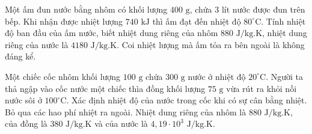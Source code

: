 \begin{ex}
Một ấm đun nước bằng nhôm có khối lượng $400\text{ g}$, chứa $3\text{ lít}$ nước được đun trên bếp. Khi nhận được nhiệt lượng $740\text{ kJ}$ thì ấm đạt đến nhiệt độ $80^\circ\text{C}$. Tính nhiệt độ ban đầu của ấm nước, biết nhiệt dung riêng của nhôm $880\text{ J/kg.K}$, nhiệt dung riêng của nước là $4180\text{ J/kg.K}$. Coi nhiệt lượng mà ấm tỏa ra bên ngoài là không đáng kể.


\end{ex}

\begin{ex}
Một chiếc cốc nhôm khối lượng $100\text{ g}$ chứa $300\text{ g}$ nước ở nhiệt độ $20^\circ\text{C}$. Người ta thả ngập vào cốc nước một chiếc thìa đồng khối lượng $75\text{ g}$ vừa rút ra khỏi nồi nước sôi ở $100^\circ\text{C}$. Xác định nhiệt độ của nước trong cốc khi có sự cân bằng nhiệt. Bỏ qua các hao phí nhiệt ra ngoài. Nhiệt dung riêng của nhôm là $880\text{ J/kg.K}$, của đồng là $380\text{ J/kg.K}$ và của nước là $4{,}19\cdot10^3\text{ J/kg.K}$.


\end{ex}

